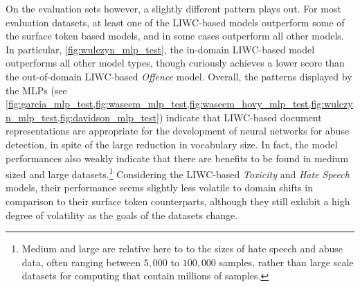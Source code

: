 On the evaluation sets however, a slightly different pattern plays out. For most evaluation datasets, at least one of the LIWC-based models outperform some of the surface token based models, and in some cases outperform all other models. In particular, \cref{fig:wulczyn_mlp_test}, the in-domain LIWC-based model outperforms all other model types, though curiously achieves a lower score than the out-of-domain LIWC-based \textit{Offence} model.
Overall, the patterns displayed by the MLPs (see \cref{fig:garcia_mlp_test,fig:waseem_mlp_test,fig:waseem_hovy_mlp_test,fig:wulczyn_mlp_test,fig:davidson_mlp_test}) indicate that LIWC-based document representations are appropriate for the development of neural networks for abuse detection, in spite of the large reduction in vocabulary size.
In fact, the model performances also weakly indicate that there are benefits to be found in medium sized and large datasets.\footnote{Medium and large are relative here to to the sizes of hate speech and abuse data, often ranging between $5,000$ to $100,000$ samples, rather than large scale datasets for computing that contain millions of samples.} 
Considering the LIWC-based \textit{Toxicity} and \textit{Hate Speech} models, their performance seems slightly less volatile to domain shifts in comparison to their surface token counterparts, although they still exhibit a high degree of volatility as the goals of the datasets change.

